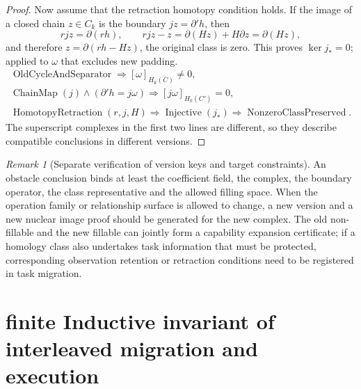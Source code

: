 \documentclass[12pt,a4paper,openany,notitlepage]{report}
\theoremstyle{plain}
\theoremstyle{definition}
\theoremstyle{remark}
\newtheorem{remark}[theorem]{Remark}
\begin{document}
\begin{CJK*}
\begin{proof}
Now assume that the retraction homotopy condition holds. If the image of a closed chain $z\in C_k$ is the boundary $jz=\partial'h$, then \[
 rjz=\partial(rh),\qquad
 rjz-z=\partial(Hz)+H\partial z=\partial(Hz),
\] and therefore $z=\partial(rh-Hz)$, the original class is zero. This proves $\ker j_*=0$; applied to $\omega$ that excludes new padding. \[
\begin{gathered}
 \operatorname{OldCycleAndSeparator}
 \Rightarrow [\omega]_{H_k(C)}\ne0,\\
 \operatorname{ChainMap}(j)\land(\partial'h=j\omega)
 \Rightarrow [j\omega]_{H_k(C')}=0,\\
 \operatorname{HomotopyRetraction}(r,j,H)
 \Rightarrow\operatorname{Injective}(j_*)
 \Rightarrow\operatorname{NonzeroClassPreserved}.
\end{gathered}
\] The superscript complexes in the first two lines are different, so they describe compatible conclusions in different versions.\end{proof}


\begin{remark}
[Separate verification of version keys and target constraints]An obstacle conclusion binds at least the coefficient field, the complex, the boundary operator, the class representative and the allowed filling space. When the operation family or relationship surface is allowed to change, a new version and a new nuclear image proof should be generated for the new complex. The old non-fillable and the new fillable can jointly form a capability expansion certificate; if a homology class also undertakes task information that must be protected, corresponding observation retention or retraction conditions need to be registered in task migration.\end{remark}


\section { finite Inductive invariant of interleaved migration and execution }\label{exp:gov:finite-governance-section}



\end{CJK*}
\end{document}
